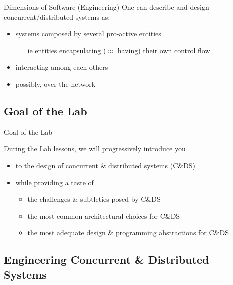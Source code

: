\documentclass[presentation]{beamer}\mode<presentation>{\usetheme{AMSCesenaPurpleAndGold}}
\begin{document}
\begin{frame}[c,allowframebreaks]{Dimensions of Software (Engineering)}
	One can describe and design concurrent/distributed systems as:
	\begin{itemize}
		\item systems composed by several \alert{pro-active} entities
		\begin{itemize}
			\item[ie] entities \alert{encapsulating} ($\approx$ having) their own \alert{control flow}
		\end{itemize}
		\item \alert{interacting} among each others
		\item possibly, over the \alert{network}
	\end{itemize}

\end{frame}

\subsection{Goal of the Lab}

\begin{frame}[c]{Goal of the Lab}

	During the Lab lessons, we will progressively introduce you
	\vfill
	\begin{itemize}
		\item to the \alert{design} of concurrent \& distributed systems (C\&DS)

		\vfill

		\item while providing a taste of
		\begin{itemize}
			\item the challenges \& subtleties posed by C\&DS
			\item the most common architectural choices for C\&DS
			\item the most adequate design \& programming abstractions for C\&DS
		\end{itemize}

	\end{itemize}

\end{frame}

\subsection{Engineering Concurrent \& Distributed Systems}
\end{document}
